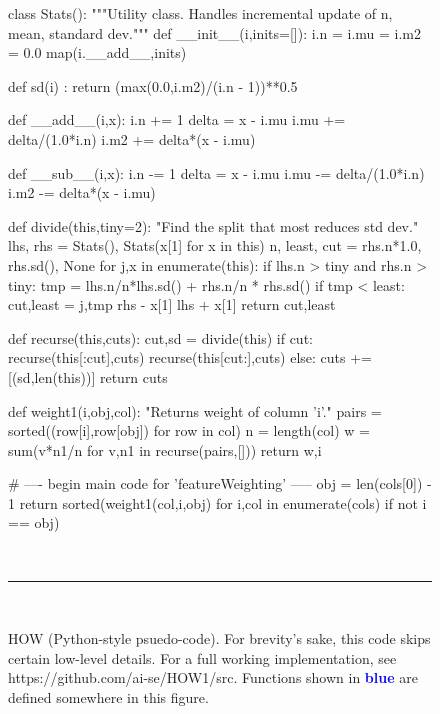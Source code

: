 \begin{figure*}
\begin{minipage}[t]{.45\linewidth}
\begin{python}[right]
  class Stats():  
    """Utility class. Handles incremental update of
       n, mean, standard dev."""
    def __init__(i,inits=[]):
      i.n = i.mu = i.m2 = 0.0
      map(i.__add__,inits)
      
    def sd(i) :  
      return (max(0.0,i.m2)/(i.n - 1))**0.5
      
    def __add__(i,x):
      i.n  += 1
      delta = x - i.mu
      i.mu += delta/(1.0*i.n)
      i.m2 += delta*(x - i.mu) 
      
    def __sub__(i,x):
      i.n  -= 1
      delta = x - i.mu
      i.mu -= delta/(1.0*i.n)
      i.m2 -= delta*(x - i.mu) 
      
  def divide(this,tiny=2):
    "Find the split that most reduces std dev."
    lhs, rhs = Stats(), Stats(x[1] for x in this)
    n, least, cut = rhs.n*1.0, rhs.sd(), None
    for j,x in enumerate(this):
      if lhs.n > tiny and rhs.n > tiny:
        tmp = lhs.n/n*lhs.sd() + rhs.n/n * rhs.sd()
        if tmp < least:
           cut,least = j,tmp
      rhs - x[1]
      lhs + x[1]
    return cut,least
    
  def recurse(this,cuts):
    cut,sd = divide(this)
    if cut:
      recurse(this[:cut],cuts)
      recurse(this[cut:],cuts)
    else:
      cuts += [(sd,len(this))]
    return cuts  
    
  def weight1(i,obj,col):
    "Returns weight of column 'i'."
    pairs = sorted((row[i],row[obj]) for row in col)
    n     = length(col)
    w     = sum(v*n1/n for v,n1 in recurse(pairs,[]))
    return w,i
    
  # ---- begin main code for 'featureWeighting' -----
  obj = len(cols[0]) - 1 
  return sorted(weight1(col,i,obj)
                for i,col in enumerate(cols) 
                if not i == obj)

\end{python}
\end{minipage}
~\hrule~
\caption{HOW (Python-style psuedo-code).
For brevity's sake, this code skips certain low-level details.
For a full working implementation, see https://github.com/ai-se/HOW1/src.
Functions shown in \textcolor{blue}{{\bf blue}} are defined somewhere in this figure.}\label{fig:howcode}   
\end{figure*}
